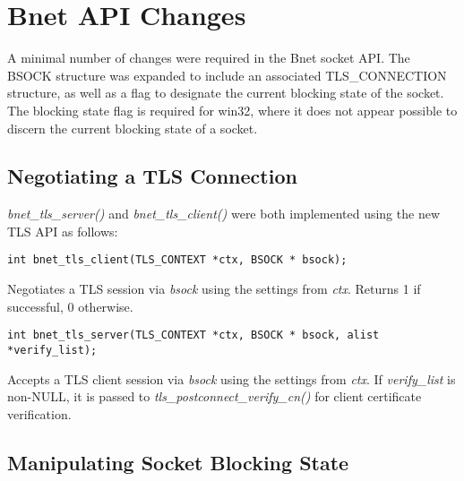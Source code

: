 \section{Bnet API Changes}

A minimal number of changes were required in the Bnet socket API. The BSOCK
structure was expanded to include an associated TLS\_CONNECTION structure,
as well as a flag to designate the current blocking state of the socket.
The blocking state flag is required for win32, where it does not appear
possible to discern the current blocking state of a socket.

\subsection{Negotiating a TLS Connection}

\emph{bnet\_tls\_server()} and \emph{bnet\_tls\_client()} were both
implemented using the new TLS API as follows:

\footnotesize
\begin{verbatim}
int bnet_tls_client(TLS_CONTEXT *ctx, BSOCK * bsock);
\end{verbatim}
\normalsize

Negotiates a TLS session via \emph{bsock} using the settings from
\emph{ctx}.  Returns 1 if successful, 0 otherwise.

\footnotesize
\begin{verbatim}
int bnet_tls_server(TLS_CONTEXT *ctx, BSOCK * bsock, alist *verify_list);
\end{verbatim}
\normalsize

Accepts a TLS client session via \emph{bsock} using the settings from
\emph{ctx}.  If \emph{verify\_list} is non-NULL, it is passed to
\emph{tls\_postconnect\_verify\_cn()} for client certificate verification.

\subsection{Manipulating Socket Blocking State}

